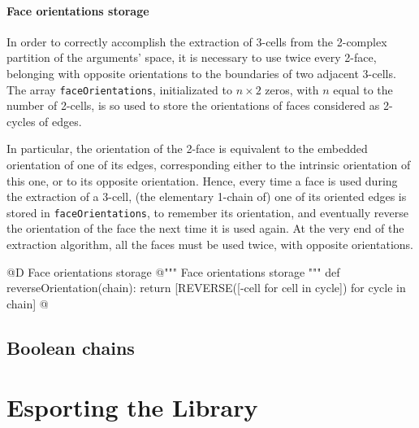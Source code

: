 \documentclass[11pt,oneside]{article}    %
\begin{document}
\paragraph{Face orientations storage}

In order to correctly accomplish the extraction of 3-cells from the 2-complex partition of the arguments' space, it is necessary to use twice every 2-face, belonging with opposite orientations to the boundaries of two adjacent 3-cells. The array \texttt{faceOrientations}, initializated to $n\times 2$ zeros, with $n$ equal to the number of 2-cells, is so used to store the orientations of faces considered as 2-cycles of edges. 

In particular, the orientation of the 2-face is equivalent to the embedded orientation of one of its edges, corresponding either to the intrinsic orientation of this one, or to its opposite orientation. Hence, every time a face is used during the extraction of a 3-cell, (the elementary 1-chain of) one of its oriented edges is stored in \texttt{faceOrientations}, to remember its orientation, and eventually reverse the orientation of the face the next time it is used again. At the very end of the extraction algorithm, all the faces must be used twice, with opposite orientations. 

@D Face orientations storage
@{""" Face orientations storage """
def reverseOrientation(chain):
    return [REVERSE([-cell for cell in cycle]) for cycle in chain]
@}


\subsection{Boolean chains}

\section{Esporting the Library}
\end{document}
